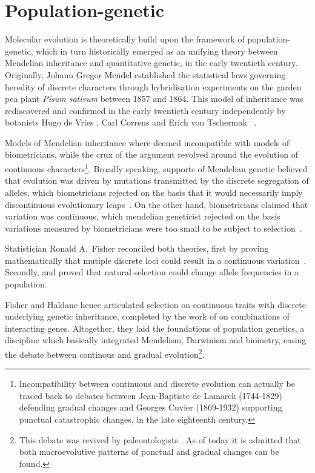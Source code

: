 \section{Population-genetic}
Molecular evolution is theoretically build upon the framework of population-genetic, which in turn historically emerged as an unifying theory between Mendelian inheritance and quantitative genetic, in the early twentieth century.
Originally,
Johann Gregor Mendel%
 established the statistical laws governing heredity of discrete characters through  hybridisation experiments on the garden pea plant \textit{Pisum sativum} between 1857 and 1864.
This model of inheritance was rediscovered and confirmed in the early twentieth century independently by botanists
Hugo de Vries%
, Carl Correns%
 and Erich von Tschermak%
 ~\citep{dunn2003gregor}.

Models of Mendelian inheritance where deemed incompatible with models of biometricians, while the crux of the argument revolved around the evolution of continuous characters\footnote{Incompatibility between continuous and discrete evolution can actually be traced back to debates between Jean-Baptiste de Lamarck (1744-1829) defending gradual changes and Georges Cuvier (1869-1932) supporting punctual catastrophic changes, in the late eighteenth century.}.
Broadly speaking, supports of Mendelian genetic believed that evolution was driven by mutations transmitted by the discrete segregation of \glspl{allele}, which biometricians rejected on the basis that it would necessarily imply discontinuous evolutionary leaps~\citep{bowler2003evolution}.
On the other hand, biometricians claimed that variation was continuous, which mendelian geneticist rejected on the basis variations measured by biometricians were too small to be subject to selection~\citep{provine2001origins}.

Statistician Ronald A.\ Fisher reconciled both theories, first by proving mathematically that mutiple discrete loci could result in a continuous variation~\citep{fisher1919xv}.
Secondly, \citet{fisher1930genetical} and \citet{haldane1932causes} proved that natural selection could change \gls{allele} frequencies in a population.

Fisher and Haldane hence articulated selection on continuous traits with discrete underlying genetic inheritance, completed by the work of \citet{wright1932roles} on combinations of interacting genes.
Altogether, they laid the foundations of population genetics, a discipline which basically integrated Mendelism, Darwinism and biometry, easing the debate between continous and gradual evolution\footnote{This debate was revived by paleontologists \citet*{Gould1972}.
As of today it is admitted that both macroevolutive patterns of ponctual and gradual changes can be found.}.

